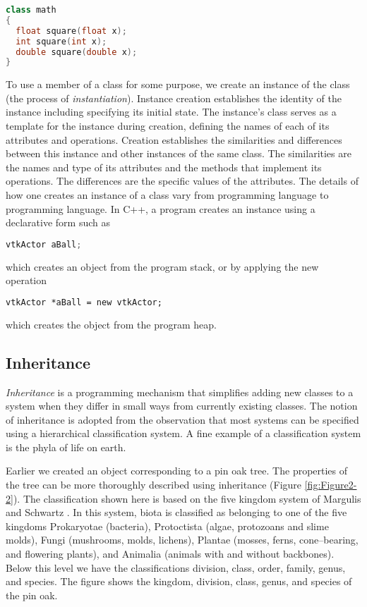 \begin{lstlisting}[language=C++, caption={math class.}]
class math
{
  float square(float x);
  int square(int x);
  double square(double x);
}
\end{lstlisting}

To use a member of a class for some purpose, we create an instance of the class (the process of \emph{instantiation}). Instance creation establishes the identity of the instance including specifying its initial state. The instance's class serves as a template for the instance during creation, defining the names of each of its attributes and operations. Creation establishes the similarities and differences between this instance and other instances of the same class. The similarities are the names and type of its attributes and the methods that implement its operations. The differences are the specific values of the attributes. The details of how one creates an instance of a class vary from programming language to programming language. In C++, a program creates an instance using a declarative form such as

\begin{lstlisting}[language=C++,  caption={}, numbers=none, frame=none]
vtkActor aBall;
\end{lstlisting}

\noindent which creates an object from the program stack, or by applying the new operation

\begin{lstlisting}[language=TCL,  caption={}, numbers=none, frame=none]
vtkActor *aBall = new vtkActor;
\end{lstlisting}

\noindent which creates the object from the program heap.

\subsection{Inheritance}
\emph{Inheritance} is a programming mechanism that simplifies adding new classes to a system when they differ in small ways from currently existing classes. The notion of inheritance is adopted from the observation that most systems can be specified using a hierarchical classification system. A fine example of a classification system is the phyla of life on earth.

Earlier we created an object corresponding to a pin oak tree. The properties of the tree can be more thoroughly described using inheritance (Figure \ref{fig:Figure2-2}). The classification shown here is based on the five kingdom system of Margulis and Schwartz \cite{Margulis88}.
In this system, biota is classified as belonging to one of the five kingdoms Prokaryotae (bacteria), Protoctista (algae, protozoans and slime molds), Fungi (mushrooms, molds, lichens), Plantae (mosses, ferns, cone--bearing, and flowering plants), and Animalia (animals with and without backbones). Below this level we have the classifications division, class, order, family, genus, and species. The figure shows the kingdom, division, class, genus, and species of the pin oak.

